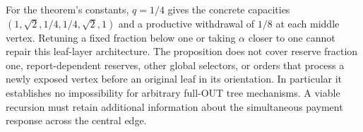 For the theorem's constants, $q=1/4$ gives the concrete capacities
$(1,\sqrt2,1/4,1/4,\sqrt2,1)$ and a productive withdrawal of $1/8$
at each middle vertex. Retuning a fixed fraction below one or taking
$\alpha$ closer to one cannot repair this leaf-layer architecture. The
proposition does not cover reserve fraction one, report-dependent reserves,
other global selectors, or orders that process a newly exposed vertex before
an original leaf in its orientation. In particular it establishes no
impossibility for arbitrary full-OUT tree mechanisms. A viable recursion
must retain additional information about the simultaneous payment response
across the central edge.
